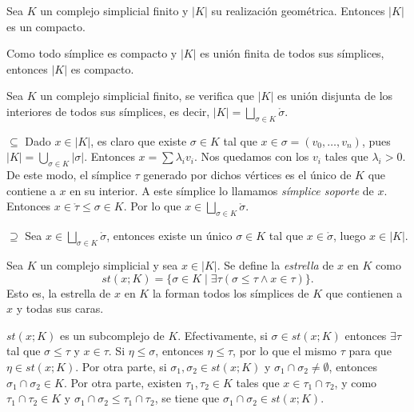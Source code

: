 \documentclass[HS.tex]{subfiles}
\begin{document}
\begin{prop}
Sea $K$ un complejo simplicial finito y $|K|$ su realización geométrica. Entonces $|K|$ es un compacto.
\end{prop}
\begin{dem}
Como todo símplice es compacto y $|K|$ es unión finita de todos sus símplices, entonces $|K|$ es compacto. \QED
\end{dem}

\begin{lemma}
Sea $K$ un complejo simplicial finito, se verifica que $|K|$ es unión disjunta de los interiores de todos sus símplices, es decir, $|K|=\underset{\sigma\in K}\bigsqcup\mathring{\sigma}$.
\end{lemma}
\begin{dem}
$\boxed{\subseteq}$ Dado $x\in |K|$, es claro que existe $\sigma\in K$ tal que $x\in\sigma=(v_0,\dots, v_n)$, pues $|K|=\bigcup_{\sigma\in K}|\sigma|$.  Entonces $x=\sum\lambda_i v_i$. Nos quedamos con los $v_i$ tales que $\lambda_i>0$. De este modo, el símplice $\tau$ generado por dichos vértices es el único de $K$ que contiene a $x$ en su interior. A este símplice lo llamamos \emph{símplice soporte} de $x$. Entonces $x\in\mathring{\tau}\leq \sigma\in K$. Por lo que $x\in \underset{\sigma\in K}\bigsqcup\mathring{\sigma}$.

$\boxed{\supseteq}$ Sea $x\in \underset{\sigma\in K}\bigsqcup\mathring{\sigma}$, entonces existe un único $\sigma\in K$ tal que $x\in\mathring{\sigma}$, luego $x\in |K|$.
\end{dem} 

\begin{defi} Sea $K$ un complejo simplicial y sea $x\in |K|$. Se define la \emph{estrella} de $x$ en $K$ como 
\[
st(x;K)=\{\sigma\in K\mid \exists \tau (\sigma\leq \tau\land x\in\tau)\}.
\]
Esto es, la estrella de $x$ en $K$ la forman todos los símplices de $K$ que contienen a $x$ y todas sus caras.
\end{defi}

\begin{nota}
$st(x;K)$ es un subcomplejo de $K$. Efectivamente, si $\sigma\in st(x;K)$ entonces $\exists \tau$ tal que $\sigma\leq\tau$ y $x\in\tau$. Si $\eta\leq\sigma$, entonces $\eta\leq\tau$, por lo que el mismo $\tau$ para que $\eta\in st(x;K)$. Por otra parte, si $\sigma_1,\sigma_2\in st(x;K)$ y $\sigma_1\cap\sigma_2\neq\emptyset$, entonces $\sigma_1\cap\sigma_2\in K$. Por otra parte, existen $\tau_1,\tau_2\in K$ tales que $x\in\tau_1\cap\tau_2$, y como $\tau_1\cap\tau_2\in K$ y $\sigma_1\cap\sigma_2\leq \tau_1\cap\tau_2$, se tiene que $\sigma_1\cap\sigma_2\in st(x;K)$.
\end{nota}
\end{document}
